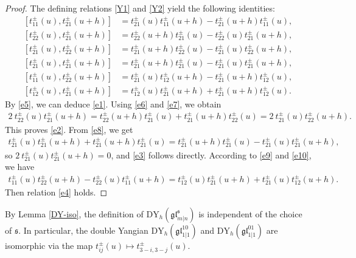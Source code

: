 \documentclass[a4paper,12pt]{article}
\numberwithin{equation}{section}
\begin{document}
\begin{proof}
The defining relations \eqref{Y1} and \eqref{Y2} yield the following identities:
\begin{align}\label{e5}
\left[t_{11}^{\pm}(u),t_{21}^{\pm}(u+h)\right]&=t_{21}^{\pm}(u)t_{11}^{\pm}(u+h)-t_{21}^{\pm}(u+h)t_{11}^{\pm}(u),\\ \label{e6}
\left[t_{22}^{\pm}(u),t_{21}^{\pm}(u+h)\right]&=t_{22}^{\pm}(u+h)t_{21}^{\pm}(u)-t_{22}^{\pm}(u)t_{21}^{\pm}(u+h),\\
\label{e7}
\left[t_{21}^{\pm}(u),t_{22}^{\pm}(u+h)\right]&=t_{21}^{\pm}(u+h)t_{22}^{\pm}(u)-t_{21}^{\pm}(u)t_{22}^{\pm}(u+h),\\
\label{e8}
\left[t_{21}^{\pm}(u),t_{21}^{\pm}(u+h)\right]&=t_{21}^{\pm}(u+h)t_{21}^{\pm}(u)-t_{21}^{\pm}(u)t_{21}^{\pm}(u+h),\\
\label{e9}
\left[t_{11}^{\pm}(u),t_{22}^{\pm}(u+h)\right]&=t_{21}^{\pm}(u)t_{12}^{\pm}(u+h)-t_{21}^{\pm}(u+h)t_{12}^{\pm}(u),\\
\label{e10}
\left[t_{12}^{\pm}(u),t_{21}^{\pm}(u+h)\right]&=t_{12}^{\pm}(u)t_{21}^{\pm}(u+h)+t_{21}^{\pm}(u+h)t_{12}^{\pm}(u).
\end{align}
By \eqref{e5}, we can deduce \eqref{e1}. Using \eqref{e6} and \eqref{e7}, we obtain
\begin{align*}
2~t_{22}^{\pm}(u)t_{21}^{\pm}(u+h)=t_{22}^{\pm}(u+h)t_{21}^{\pm}(u)+t_{21}^{\pm}(u+h)
t_{22}^{\pm}(u)=2~t_{21}^{\pm}(u)t_{22}^{\pm}(u+h).
\end{align*}
This proves \eqref{e2}.
From \eqref{e8}, we get
\begin{align*}
t_{21}^{\pm}(u)t_{21}^{\pm}(u+h)+t_{21}^{\pm}(u+h)t_{21}^{\pm}(u)=t_{21}^{\pm}(u+h)t_{21}^{\pm}(u)-t_{21}^{\pm}(u)t_{21}^{\pm}(u+h),
\end{align*}
so $2~t_{21}^{\pm}(u)t_{21}^{\pm}(u+h)=0$, and \eqref{e3} follows directly. According to \eqref{e9} and \eqref{e10}, we have
\begin{align*}
t_{11}^{\pm}(u)t_{22}^{\pm}(u+h)-t_{22}^{\pm}(u)t_{11}^{\pm}(u+h)=t_{12}^{\pm}(u)t_{21}^{\pm}(u+h)+t_{21}^{\pm}(u)t_{12}^{\pm}(u+h).
\end{align*}
Then relation \eqref{e4} holds.
\end{proof}

By Lemma \ref{DY-iso}, the definition of $\mathrm{DY}_{h}(\mathfrak{gl}_{m|n}^{\mathfrak{s}})$ is independent of the choice of $\mathfrak{s}$. In particular, the double Yangian $\mathrm{DY}_{h}(\mathfrak{gl}_{1|1}^{10})$ and $\mathrm{DY}_{h}(\mathfrak{gl}_{1|1}^{01})$ are isomorphic via the map $t_{ij}^{\pm}(u)\mapsto t_{3-i,3-j}^{\pm}(u)$.
\end{document}
